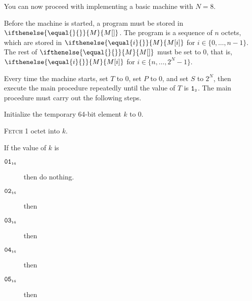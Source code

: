 \documentclass[a4paper,12pt]{article}
\newcommand{\num}[1]{\texttt{#1}}
\newcommand{\hex}[1]{\num{#1}_{\textup{\tiny 16}}}
\newcommand{\bin}[1]{\num{#1}_{\textup{\tiny 2}}}
\newcommand{\MEM}[1]{\ifthenelse{\equal{#1}{}}{M}{M[#1]}}
\newcommand{\PC}{P}
\newcommand{\SP}{S}
\newcommand{\TERM}{T}
\newcommand{\T}{\bin{1}}
\newcommand{\range}[2]{\{#1,\ldots,#2\}}
\newcommand{\proc}[1]{\textsc{#1}}
\newcommand{\op}[1]{$#1$}
\newcommand{\NOP}       [1]{\op{\hex{01}}}
\newcommand{\JUMP}      [1]{\op{\hex{02}}}
\newcommand{\JUMPZERO}  [1]{\op{\hex{03}}}
\newcommand{\SETSP}     [1]{\op{\hex{04}}}
\newcommand{\GETPC}     [1]{\op{\hex{05}}}
\begin{document}
You can now proceed with implementing a basic machine with $N=8$.

Before the machine is started, a program must be stored in $\MEM{}$.
The program is a sequence of $n$ octets, which are stored in $\MEM{i}$ for $i \in \range{0}{n-1}$.
The rest of $\MEM{}$ must be set to 0, that is, $\MEM{i}$ for $i \in \range{n}{2^N-1}$.

Every time the machine starts, set $\TERM$ to 0, set $\PC$ to $0$, and set $\SP$ to $2^N$, then execute the main procedure repeatedly until the value of $\TERM$ is $\T$.
The main procedure must carry out the following steps.
\begin{stepnumbers}
\item Initialize the temporary 64-bit element $k$ to 0.
\item \proc{Fetch} 1 octet into $k$.
\item\label{itm:main-case} If the value of $k$ is
  \begin{description}
  \item[\NOP{}] then do nothing.
  \item[\JUMP{}] then
  \item[\JUMPZERO{}] then
  \item[\SETSP{}] then
  \item[\GETPC{}] then

\end{description}
\end{stepnumbers}
\end{document}
